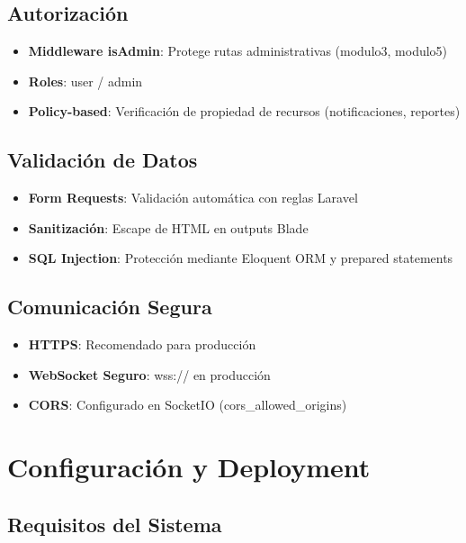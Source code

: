 \documentclass[12pt,a4paper]{article}
\begin{document}
\subsection{Autorización}

\begin{itemize}
    \item \textbf{Middleware isAdmin}: Protege rutas administrativas (modulo3, modulo5)
    \item \textbf{Roles}: user / admin
    \item \textbf{Policy-based}: Verificación de propiedad de recursos (notificaciones, reportes)
\end{itemize}

\subsection{Validación de Datos}

\begin{itemize}
    \item \textbf{Form Requests}: Validación automática con reglas Laravel
    \item \textbf{Sanitización}: Escape de HTML en outputs Blade
    \item \textbf{SQL Injection}: Protección mediante Eloquent ORM y prepared statements
\end{itemize}

\subsection{Comunicación Segura}

\begin{itemize}
    \item \textbf{HTTPS}: Recomendado para producción
    \item \textbf{WebSocket Seguro}: wss:// en producción
    \item \textbf{CORS}: Configurado en SocketIO (cors\_allowed\_origins)
\end{itemize}

\newpage

\section{Configuración y Deployment}

\subsection{Requisitos del Sistema}
\end{document}
